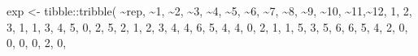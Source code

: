 \documentclass[
  letterpaper,
]{book}
\newenvironment{Shaded}{\begin{snugshade}}{\end{snugshade}}
\newcommand{\AttributeTok}[1]{\textcolor[rgb]{0.40,0.45,0.13}{#1}}
\newcommand{\DecValTok}[1]{\textcolor[rgb]{0.68,0.00,0.00}{#1}}
\newcommand{\FunctionTok}[1]{\textcolor[rgb]{0.28,0.35,0.67}{#1}}
\newcommand{\NormalTok}[1]{\textcolor[rgb]{0.00,0.23,0.31}{#1}}
\newcommand{\OtherTok}[1]{\textcolor[rgb]{0.00,0.23,0.31}{#1}}
\newcommand{\SpecialCharTok}[1]{\textcolor[rgb]{0.37,0.37,0.37}{#1}}
\newcommand{\StringTok}[1]{\textcolor[rgb]{0.13,0.47,0.30}{#1}}
\begin{document}
\begin{Shaded}
\begin{Highlighting}[]
\NormalTok{exp }\OtherTok{\textless{}{-}}\NormalTok{ tibble}\SpecialCharTok{::}\FunctionTok{tribble}\NormalTok{(}
  \SpecialCharTok{\textasciitilde{}}\NormalTok{rep, }\SpecialCharTok{\textasciitilde{}}\StringTok{\textasciigrave{}}\AttributeTok{1}\StringTok{\textasciigrave{}}\NormalTok{, }\SpecialCharTok{\textasciitilde{}}\StringTok{\textasciigrave{}}\AttributeTok{2}\StringTok{\textasciigrave{}}\NormalTok{, }\SpecialCharTok{\textasciitilde{}}\StringTok{\textasciigrave{}}\AttributeTok{3}\StringTok{\textasciigrave{}}\NormalTok{, }\SpecialCharTok{\textasciitilde{}}\StringTok{\textasciigrave{}}\AttributeTok{4}\StringTok{\textasciigrave{}}\NormalTok{, }\SpecialCharTok{\textasciitilde{}}\StringTok{\textasciigrave{}}\AttributeTok{5}\StringTok{\textasciigrave{}}\NormalTok{, }\SpecialCharTok{\textasciitilde{}}\StringTok{\textasciigrave{}}\AttributeTok{6}\StringTok{\textasciigrave{}}\NormalTok{, }\SpecialCharTok{\textasciitilde{}}\StringTok{\textasciigrave{}}\AttributeTok{7}\StringTok{\textasciigrave{}}\NormalTok{, }\SpecialCharTok{\textasciitilde{}}\StringTok{\textasciigrave{}}\AttributeTok{8}\StringTok{\textasciigrave{}}\NormalTok{, }\SpecialCharTok{\textasciitilde{}}\StringTok{\textasciigrave{}}\AttributeTok{9}\StringTok{\textasciigrave{}}\NormalTok{, }\SpecialCharTok{\textasciitilde{}}\StringTok{\textasciigrave{}}\AttributeTok{10}\StringTok{\textasciigrave{}}\NormalTok{, }\SpecialCharTok{\textasciitilde{}}\StringTok{\textasciigrave{}}\AttributeTok{11}\StringTok{\textasciigrave{}}\NormalTok{,}\SpecialCharTok{\textasciitilde{}}\StringTok{\textasciigrave{}}\AttributeTok{12}\StringTok{\textasciigrave{}}\NormalTok{,}
  \DecValTok{1}\NormalTok{, }\DecValTok{2}\NormalTok{, }\DecValTok{3}\NormalTok{, }\DecValTok{1}\NormalTok{, }\DecValTok{1}\NormalTok{, }\DecValTok{3}\NormalTok{, }\DecValTok{4}\NormalTok{, }\DecValTok{5}\NormalTok{, }\DecValTok{0}\NormalTok{, }\DecValTok{2}\NormalTok{, }\DecValTok{5}\NormalTok{, }\DecValTok{2}\NormalTok{, }\DecValTok{1}\NormalTok{,}
  \DecValTok{2}\NormalTok{, }\DecValTok{3}\NormalTok{, }\DecValTok{4}\NormalTok{, }\DecValTok{4}\NormalTok{, }\DecValTok{6}\NormalTok{, }\DecValTok{5}\NormalTok{, }\DecValTok{4}\NormalTok{, }\DecValTok{4}\NormalTok{, }\DecValTok{0}\NormalTok{, }\DecValTok{2}\NormalTok{, }\DecValTok{1}\NormalTok{, }\DecValTok{1}\NormalTok{, }\DecValTok{5}\NormalTok{,}
  \DecValTok{3}\NormalTok{, }\DecValTok{5}\NormalTok{, }\DecValTok{6}\NormalTok{, }\DecValTok{6}\NormalTok{, }\DecValTok{5}\NormalTok{, }\DecValTok{4}\NormalTok{, }\DecValTok{2}\NormalTok{, }\DecValTok{0}\NormalTok{, }\DecValTok{0}\NormalTok{, }\DecValTok{0}\NormalTok{, }\DecValTok{0}\NormalTok{, }\DecValTok{2}\NormalTok{, }\DecValTok{0}\NormalTok{,}

\end{Highlighting}
\end{Shaded}
\end{document}
